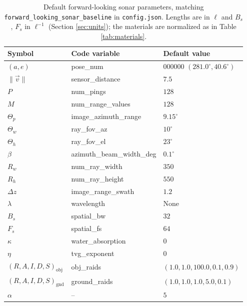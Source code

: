 \documentclass[sensors,article,submit,moreauthors]{Definitions/mdpi}
\begin{document}
\begin{table}[H]
\centering
\caption{Default forward-looking sonar parameters, matching
\texttt{forward\_looking\_sonar\_baseline} in \texttt{config.json}. Lengths are
in $\ell$ and $B_s$, $F_s$ in $\ell^{-1}$ (Section \ref{sec:units}); the
materials are normalized as in Table \ref{tab:materials}.}
\label{tab:fls-params}
\begin{tabular}{lll}
\toprule
\textbf{Symbol} & \textbf{Code variable} & \textbf{Default value} \\
\midrule
$(a,e)$                    & pose\_num                & 000000 $(281.0^\circ,
40.6^\circ)$ \\
$\lVert\vec{v}\rVert$      & sensor\_distance         & $7.5$ \\
$P$                        & num\_pings               & $128$ \\
$M$                        & num\_range\_values       & $128$ \\
$\Theta_p$                 & image\_azimuth\_range    & $9.15^\circ$ \\
$\Theta_w$                 & ray\_fov\_az             & $10^\circ$ \\
$\Theta_h$                 & ray\_fov\_el             & $23^\circ$ \\
$\beta$                    & azimuth\_beam\_width\_deg & $0.1^\circ$ \\
$R_w$                      & num\_ray\_width          & $350$ \\
$R_h$                      & num\_ray\_height         & $550$ \\
$\Delta z$                 & image\_range\_swath      & $1.2$ \\
$\lambda$                  & wavelength               & None \\
$B_s$                      & spatial\_bw              & $32$ \\
$F_s$                      & spatial\_fs              & $64$ \\
$\kappa$                   & water\_absorption        & $0$ \\
$\eta$                     & tvg\_exponent            & $0$ \\
$(R,A,I,D,S)_{\text{obj}}$ & obj\_raids               & $(1.0, 1.0, 100.0, 0.1,
0.9)$ \\
$(R,A,I,D,S)_{\text{gnd}}$ & ground\_raids            & $(1.0, 1.0, 1.0, 5.0,
0.1)$ \\
$\alpha$                  & --                     & $5$ \\

\end{tabular}
\end{table}
\end{document}
